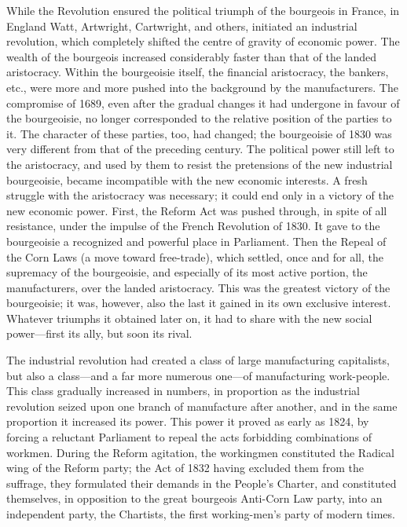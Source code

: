 While the Revolution ensured the political triumph of the bourgeois in France,
in England Watt, Artwright, Cartwright, and others, initiated an industrial
revolution, which completely shifted the centre of gravity of economic power.
The wealth of the bourgeois increased considerably faster than that of the
landed aristocracy. Within the bourgeoisie itself, the financial aristocracy,
the bankers, etc., were more and more pushed into the background by the
manufacturers. The compromise of 1689, even after the gradual changes it had
undergone in favour of the bourgeoisie, no longer corresponded to the relative
position of the parties to it. The character of these parties, too, had changed;
the bourgeoisie of 1830 was very different from that of the preceding century.
The political power still left to the aristocracy, and used by them to resist
the pretensions of the new industrial bourgeoisie, became incompatible with the
new economic interests. A fresh struggle with the aristocracy was necessary; it
could end only in a victory of the new economic power. First, the Reform Act was
pushed through, in spite of all resistance, under the impulse of the French
Revolution of 1830. It gave to the bourgeoisie a recognized and powerful place
in Parliament. Then the Repeal of the Corn Laws (a move toward free-trade),
which settled, once and for all, the supremacy of the bourgeoisie, and
especially of its most active portion, the manufacturers, over the landed
aristocracy. This was the greatest victory of the bourgeoisie; it was, however,
also the last it gained in its own exclusive interest. Whatever triumphs it
obtained later on, it had to share with the new social power---first its ally,
but soon its rival.

The industrial revolution had created a class of large manufacturing
capitalists, but also a class---and a far more numerous one---of manufacturing
work-people. This class gradually increased in numbers, in proportion as the
industrial revolution seized upon one branch of manufacture after another, and
in the same proportion it increased its power. This power it proved as early as
1824, by forcing a reluctant Parliament to repeal the acts forbidding
combinations of workmen. During the Reform agitation, the workingmen constituted
the Radical wing of the Reform party; the Act of 1832 having excluded them from
the suffrage, they formulated their demands in the People's Charter, and
constituted themselves, in opposition to the great bourgeois Anti-Corn Law
party, into an independent party, the Chartists, the first working-men's party
of modern times.

